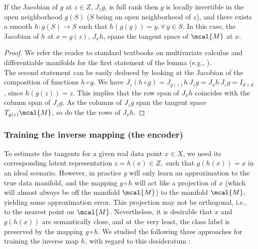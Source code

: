 \documentclass{article}
\begin{document}
\begin{lem}
If the Jacobian of $g$ at $z\in Z$, $J_z g$, is full rank then $g$ is locally invertible in the open neighborhood $g(S)$ ($S$ being an open neighborhood of $z$), and there exists a smooth $h:g(S)\to S$ such that $h(g(y))=y,\forall\,y\in S$. In this case, the Jacobian of $h$ at $x=g(z)$, $J_x h$, spans the tangent space of $\mcal{M}$ at $x$.
\label{lem:tangenc}
\end{lem}\begin{proof}
We refer the reader to standard textbooks on multivariate calculus and differentiable manifolds for the first statement of the lemma (e.g., \cite{spivak_CompVol1}).\\
The second statement can be easily deduced by looking at the Jacobian of the composition of functions $h\circ g$. We have $J_z (h\circ g) = J_{g(z)} h\, J_z g = J_x h \,J_z g = I_{d\times d}$, since $h(g(z))=z$. This implies that the row span of $J_x h$ coincides with the column span of $J_z g$. As the columns of $J_z g$ span the tangent space $T_{g(z)}\mcal{M}$, so do the the rows of $J_x h$. 
\end{proof}\subsubsection{Training the inverse mapping (the encoder)}
To estimate the tangents for a given real data point $x\in X$, we need its corresponding latent representation $z=h(x) \in Z,$ such that $g(h(x))=x$ in an ideal scenario. However, in practice $g$ will only learn an approximation to the true data manifold, and the mapping $g\circ h$ will act like a projection of $x$ (which will almost always be off the manifold $\mcal{M}$) to the manifold $\mcal{M},$ yielding some approximation error. This projection may not be orthogonal, i.e., to the nearest point on $\mcal{M}$. Nevertheless, it is desirable that $x$ and $g(h(x))$ are semantically close, and at the very least, the class label is preserved by the mapping $g\circ h$. We studied the following three approaches for training the inverse map $h$, with regard to this desideratum : 
\end{document}
